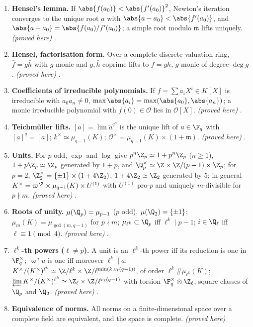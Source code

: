 \begin{enumerate}[label=\textbf{\thechapter.\arabic*}]
\item \textbf{Hensel's lemma.} If $\abs{f(a_0)}<\abs{f'(a_0)}^2$, Newton's iteration converges to the unique root $a$ with $\abs{a-a_0}<\abs{f'(a_0)}$, and
$\abs{a-a_0}=\abs{f(a_0)/f'(a_0)}$; a simple root modulo $\mathfrak m$ lifts uniquely. \emph{(proved here)} .
\item \textbf{Hensel, factorisation form.} Over a complete discrete valuation ring, $\bar f=\bar g\bar h$ with $\bar g$ monic and $\bar g,\bar h$ coprime lifts to $f=gh$, $g$
monic of degree $\deg\bar g$. \emph{(proved here)} .
\item \textbf{Coefficients of irreducible polynomials.} If $f=\sum a_iX^i\in K[X]$ is irreducible with $a_0a_n\ne0$, $\max\abs{a_i}=\max(\abs{a_0},\abs{a_n})$; a monic irreducible
polynomial with $f(0)\in\mathcal O$ lies in $\mathcal O[X]$. \emph{(proved here)} .
\item \textbf{Teichm\"uller lifts.} $[a]=\lim\tilde a^{q^n}$ is the unique lift of $a\in\F_q$ with $[a]^q=[a]$; $k^\times\simeq\mu_{q-1}(K)$; $\mathcal O^\times=\mu_{q-1}(K)\times(1+\mathfrak m)$.
\emph{(proved here)} .
\item \textbf{Units.} For $p$ odd, $\exp$ and $\log$ give $p^n\Z_p\simeq1+p^n\Z_p$ ($n\ge1$), $1+p\Z_p\simeq\Z_p$ generated by $1+p$, and $\Q_p^\times\simeq\Z\times\Z/(p-1)\times\Z_p$;
for $p=2$, $\Z_2^\times=\{\pm1\}\times(1+4\Z_2)$, $1+4\Z_2\simeq\Z_2$ generated by $5$; in general $K^\times=\varpi^{\Z}\times\mu_{q-1}(K)\times U^{(1)}$ with $U^{(1)}$ pro-$p$ and uniquely
$m$-divisible for $p\nmid m$. \emph{(proved here)} .
\item \textbf{Roots of unity.} $\mu(\Q_p)=\mu_{p-1}$ ($p$ odd), $\mu(\Q_2)=\{\pm1\}$; $\mu_m(K)=\mu_{\gcd(m,q-1)}$ for $p\nmid m$; $\mu_{\ell^k}\subset\Q_p$ iff $\ell^k\mid p-1$; $i\in\Q_\ell$ iff
$\ell\equiv1\pmod4$. \emph{(proved here)} .
\item \textbf{$\ell^k$-th powers ($\ell\ne p$).} A unit is an $\ell^k$-th power iff its reduction is one in $\F_q^\times$; $\varpi^au$ is one iff moreover $\ell^k\mid a$;
$K^\times/(K^\times)^{\ell^k}\simeq\Z/\ell^k\times\Z/\ell^{\min(k,v_\ell(q-1))}$, of order $\ell^k\#\mu_{\ell^k}(K)$; $\varprojlim K^\times/(K^\times)^{\ell^k}\simeq\Z_\ell\times\Z/\ell^{v_\ell(q-1)}$ with
torsion $\F_q^\times\otimes\Z_\ell$; square classes of $\Q_p$ and $\Q_2$. \emph{(proved here)} .
\item \textbf{Equivalence of norms.} All norms on a finite-dimensional space over a complete field are equivalent, and the space is complete. \emph{(proved here)}

\end{enumerate}
